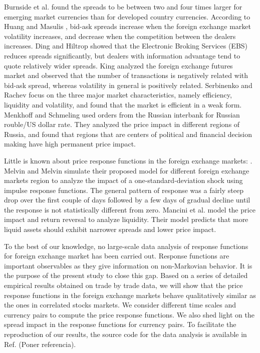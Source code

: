 Burnside et al. \cite{curr_speculation} found the spreads to be between two and
four times larger for emerging market currencies than for developed country
currencies. According to Huang and Masulis \cite{spread_competition}, bid-ask
spreads increase when the foreign exchange market volatility increases, and
decrease when the competition between the dealers increases. Ding and Hiltrop
\cite{electronic_forex} showed that the Electronic Broking Services (EBS)
reduces spreads significantly, but dealers with information advantage tend to
quote relatively wider spreads. King \cite{spread_futures} analyzed the foreign
exchange futures market and observed that the number of transactions is
negatively related with bid-ask spread, whereas volatility in general is
positively related. Serbinenko and Rachev \cite{intraday_forex} focus on the
three major market characteristics, namely efficiency, liquidity and
volatility, and found that the market is efficient in a weak form. Menkhoff and
Schmeling \cite{local_forex} used orders from the Russian interbank for Russian
rouble/US dollar rate. They analyzed the price impact in different regions of
Russia, and found that regions that are centers of political and financial
decision making have high permanent price impact.

Little is known about price response functions in the foreign exchange markets:
\cite{forex_liquidity,forex_volatility}. Melvin and Melvin \cite{forex_volatility}
simulate their proposed model for different foreign exchange markets region to
analyze the impact of a one-standard-deviation shock using impulse response
functions. The general pattern of response was a fairly steep drop over the
first couple of days followed by a few days of gradual decline until the
response is not statistically different from zero. Mancini et al.
\cite{forex_liquidity} model the price impact and return reversal to analyze
liquidity. Their model predicts that more liquid assets should exhibit narrower
spreads and lower price impact.

To the best of our knowledge, no large-scale data analysis of response
functions for foreign exchange market has been carried out. Response functions
are important observables as they give information on non-Markovian behavior.
It is the purpose of the present study to close this gap. Based on a series of
detailed empirical results obtained on trade by trade data, we will show that
the price response functions in the foreign exchange markets behave
qualitatively similar as the ones in correlated stocks markets. We consider
different time scales and currency pairs to compute the price response
functions. We also shed light on the spread impact in the response functions
for currency pairs. To facilitate the reproduction of our results, the source
code for the data analysis is available in Ref. (Poner referencia).

